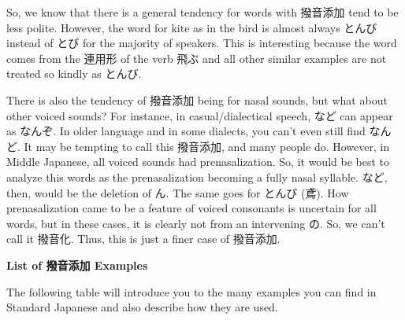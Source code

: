 \par{ So, we know that there is a general tendency for words with 撥音添加 tend to be less polite. However, the word for kite as in the bird is almost always とんび instead of とび for the majority of speakers. This is interesting because the word comes from the 連用形 of the verb 飛ぶ and all other similar examples are not treated so kindly as とんび. }

\par{ There is also the tendency of 撥音添加 being for nasal sounds, but what about other voiced sounds? For instance, in casual\slash dialectical speech, など can appear as なんぞ. In older language and in some dialects, you can't even still find なんど. It may be tempting to call this 撥音添加, and many people do. However, in Middle Japanese, all voiced sounds had prenasalization. So, it would be best to analyze this words as the prenasalization becoming a fully nasal syllable. など, then, would be the deletion of ん. The same goes for とんび (鳶). How prenasalization came to be a feature of voiced consonants is uncertain for all words, but in these cases, it is clearly not from an intervening の. So, we can't call it 撥音化. Thus, this is just a finer case of 撥音添加. }

\begin{center}
  \textbf{List of 撥音添加 Examples }
\end{center}

\par{ The following table will introduce you to the many examples you can find in Standard Japanese and also describe how they are used. }

